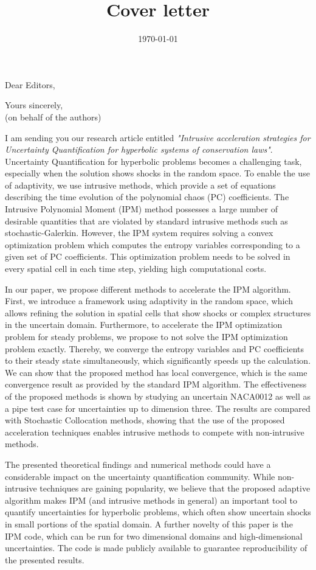 \documentclass[11pt,a4paper,roman]{moderncv}        %
\title{Cover letter}                               %
\begin{document}
\recipient{~}{}
\date{\today}
\opening{Dear Editors,}
\closing{Yours sincerely, \\ (on behalf of the authors)}
\makelettertitle

I am sending you our research article entitled \textit{"Intrusive acceleration strategies for Uncertainty Quantification for hyperbolic systems of conservation laws"}. Uncertainty Quantification for hyperbolic problems becomes a challenging task, especially when the solution shows shocks in the random space. To enable the use of adaptivity, we use intrusive methods, which provide a set of equations describing the time evolution of the polynomial chaos (PC) coefficients. The Intrusive Polynomial Moment (IPM) method possesses a large number of desirable quantities that are violated by standard intrusive methods such as stochastic-Galerkin. However, the IPM system requires solving a convex optimization problem which computes the entropy variables corresponding to a given set of PC coefficients. This optimization problem needs to be solved in every spatial cell in each time step, yielding high computational costs.

In our paper, we propose different methods to accelerate the IPM algorithm. First, we introduce a framework using adaptivity in the random space, which allows refining the solution in spatial cells that show shocks or complex structures in the uncertain domain. Furthermore, to accelerate the IPM optimization problem for steady problems, we propose to not solve the IPM optimization problem exactly. Thereby, we converge the entropy variables and PC coefficients to their steady state simultaneously, which significantly speeds up the calculation. We can show that the proposed method has local convergence, which is the same convergence result as provided by the standard IPM algorithm. The effectiveness of the proposed methods is shown by studying an uncertain NACA0012 as well as a pipe test case for uncertainties up to dimension three. The results are compared with Stochastic Collocation methods, showing that the use of the proposed acceleration techniques enables intrusive methods to compete with non-intrusive methods. 

The presented theoretical findings and numerical methods could have a considerable impact on the uncertainty quantification community. While non-intrusive techniques are gaining popularity, we believe that the proposed adaptive algorithm makes IPM (and intrusive methods in general) an important tool to quantify uncertainties for hyperbolic problems, which often show uncertain shocks in small portions of the spatial domain. A further novelty of this paper is the IPM code, which can be run for two dimensional domains and high-dimensional uncertainties. The code is made publicly available to guarantee reproducibility of the presented results.
\end{document}
